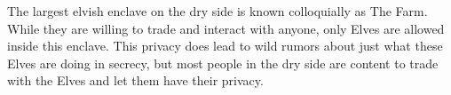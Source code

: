 The largest elvish enclave on the dry side is known colloquially as The Farm.
While they are willing to trade and interact with anyone, only Elves are allowed inside this enclave.
This privacy does lead to wild rumors about just what these Elves are doing in secrecy, but most people in the dry side are content to trade with the Elves and let them have their privacy.
